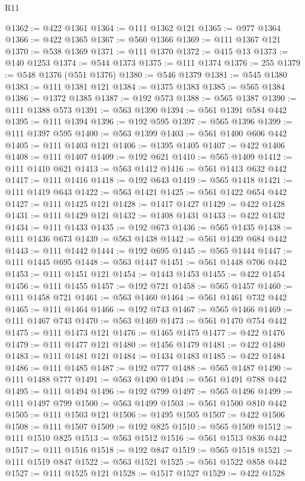 \begin{lexlean}{R11}
\begin{coremodule}
@1362 := @422 @1361
@1364 := @111 @1362 @121
@1365 := @977 @1364
@1366 := @422 @1365
@1367 := @560 @1366
@1369 := @111 @1367 @121
@1370 := @538 @1369
@1371 := @111 @1370
@1372 := @415 @13
@1373 := @140 @1253
@1374 := @544 @1373
@1375 := @111 @1374
@1376 := 255
@1379 := @548 @1376 (@551 @1376)
@1380 := @546 @1379
@1381 := @545 @1380
@1383 := @111 @1381 @121
@1384 := @1375 @1383
@1385 := @565 @1384
@1386 := @1372 @1385
@1387 := @192 @573
@1388 := @565 @1387
@1390 := @111 @1388 @573
@1391 := @563 @1390
@1394 := @561 @1391 @584 @442
@1395 := @111 @1394
@1396 := @192 @595
@1397 := @565 @1396
@1399 := @111 @1397 @595
@1400 := @563 @1399
@1403 := @561 @1400 @606 @442
@1405 := @111 @1403 @121
@1406 := @1395 @1405
@1407 := @422 @1406
@1408 := @111 @1407
@1409 := @192 @621
@1410 := @565 @1409
@1412 := @111 @1410 @621
@1413 := @563 @1412
@1416 := @561 @1413 @632 @442
@1417 := @111 @1416
@1418 := @192 @643
@1419 := @565 @1418
@1421 := @111 @1419 @643
@1422 := @563 @1421
@1425 := @561 @1422 @654 @442
@1427 := @111 @1425 @121
@1428 := @1417 @1427
@1429 := @422 @1428
@1431 := @111 @1429 @121
@1432 := @1408 @1431
@1433 := @422 @1432
@1434 := @111 @1433
@1435 := @192 @673
@1436 := @565 @1435
@1438 := @111 @1436 @673
@1439 := @563 @1438
@1442 := @561 @1439 @684 @442
@1443 := @111 @1442
@1444 := @192 @695
@1445 := @565 @1444
@1447 := @111 @1445 @695
@1448 := @563 @1447
@1451 := @561 @1448 @706 @442
@1453 := @111 @1451 @121
@1454 := @1443 @1453
@1455 := @422 @1454
@1456 := @111 @1455
@1457 := @192 @721
@1458 := @565 @1457
@1460 := @111 @1458 @721
@1461 := @563 @1460
@1464 := @561 @1461 @732 @442
@1465 := @111 @1464
@1466 := @192 @743
@1467 := @565 @1466
@1469 := @111 @1467 @743
@1470 := @563 @1469
@1473 := @561 @1470 @754 @442
@1475 := @111 @1473 @121
@1476 := @1465 @1475
@1477 := @422 @1476
@1479 := @111 @1477 @121
@1480 := @1456 @1479
@1481 := @422 @1480
@1483 := @111 @1481 @121
@1484 := @1434 @1483
@1485 := @422 @1484
@1486 := @111 @1485
@1487 := @192 @777
@1488 := @565 @1487
@1490 := @111 @1488 @777
@1491 := @563 @1490
@1494 := @561 @1491 @788 @442
@1495 := @111 @1494
@1496 := @192 @799
@1497 := @565 @1496
@1499 := @111 @1497 @799
@1500 := @563 @1499
@1503 := @561 @1500 @810 @442
@1505 := @111 @1503 @121
@1506 := @1495 @1505
@1507 := @422 @1506
@1508 := @111 @1507
@1509 := @192 @825
@1510 := @565 @1509
@1512 := @111 @1510 @825
@1513 := @563 @1512
@1516 := @561 @1513 @836 @442
@1517 := @111 @1516
@1518 := @192 @847
@1519 := @565 @1518
@1521 := @111 @1519 @847
@1522 := @563 @1521
@1525 := @561 @1522 @858 @442
@1527 := @111 @1525 @121
@1528 := @1517 @1527
@1529 := @422 @1528

\end{coremodule}
\end{lexlean}
